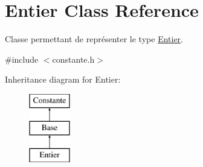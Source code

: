 \hypertarget{class_entier}{\section{Entier Class Reference}
\label{class_entier}
}


Classe permettant de représenter le type \hyperlink{class_entier}{Entier}.  




{\ttfamily \#include $<$constante.\-h$>$}

Inheritance diagram for Entier\-:\begin{figure}[H]
\begin{center}
\leavevmode
\includegraphics[height=3.000000cm]{class_entier}
\end{center}
\end{figure}
